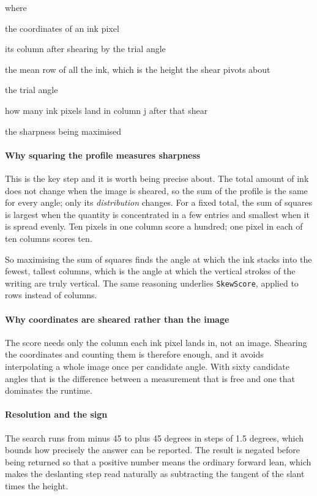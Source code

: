 \noindent where
\begin{description}[leftmargin=2.4em,style=nextline,font=\normalfont\ttfamily]\setlength\itemsep{1pt}
  \item[{$x,\, y$}] \normalfont the coordinates of an ink pixel
  \item[{$x'$}] \normalfont its column after shearing by the trial angle
  \item[{$\bar{y}$}] \normalfont the mean row of all the ink, which is the height the shear pivots about
  \item[{$\theta$}] \normalfont the trial angle
  \item[{$\mathrm{prof}_\theta[j]$}] \normalfont how many ink pixels land in column j after that shear
  \item[{$\mathrm{score}(\theta)$}] \normalfont the sharpness being maximised
\end{description}

\paragraph{Why squaring the profile measures sharpness}
This is the key step and it is worth being precise about. The total amount of ink does not change when the image is sheared, so the sum of the profile is the same for every angle; only its \emph{distribution} changes. For a fixed total, the sum of squares is largest when the quantity is concentrated in a few entries and smallest when it is spread evenly. Ten pixels in one column score a hundred; one pixel in each of ten columns scores ten.

So maximising the sum of squares finds the angle at which the ink stacks into the fewest, tallest columns, which is the angle at which the vertical strokes of the writing are truly vertical. The same reasoning underlies \texttt{SkewScore}, applied to rows instead of columns.


\paragraph{Why coordinates are sheared rather than the image}
The score needs only the column each ink pixel lands in, not an image. Shearing the coordinates and counting them is therefore enough, and it avoids interpolating a whole image once per candidate angle. With sixty candidate angles that is the difference between a measurement that is free and one that dominates the runtime.


\paragraph{Resolution and the sign}
The search runs from minus 45 to plus 45 degrees in steps of 1.5 degrees, which bounds how precisely the answer can be reported. The result is negated before being returned so that a positive number means the ordinary forward lean, which makes the deslanting step read naturally as subtracting the tangent of the slant times the height.

